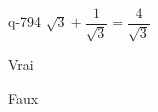 \begin{truefalse}{q-794}
$\sqrt{3}+\dfrac{1}{\sqrt{3}}=\dfrac{4}{\sqrt{3}}$
\item* Vrai
\item Faux
\end{truefalse}

